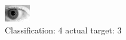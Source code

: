 \begin{figure}[h!]
\begin{center}
\includegraphics[width=0.60\columnwidth]{figures/ID323_class_4_target_3.png}
\end{center}
\caption{ Classification: 4 actual target: 3}
\label{fig:ID323_class_4_target_3}
\end{figure}
